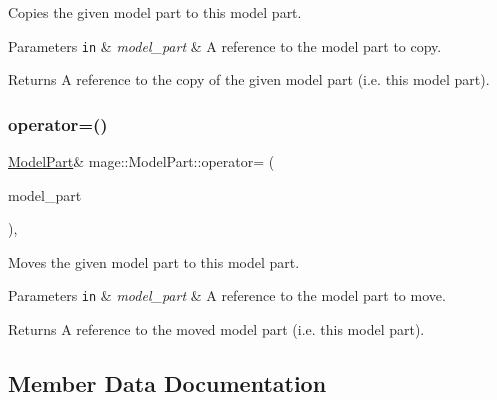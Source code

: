 Copies the given model part to this model part.


\begin{DoxyParams}[1]{Parameters}
\mbox{\tt in}  & {\em model\+\_\+part} & A reference to the model part to copy. \\
\hline
\end{DoxyParams}
\begin{DoxyReturn}{Returns}
A reference to the copy of the given model part (i.\+e. this model part). 
\end{DoxyReturn}
\hypertarget{structmage_1_1_model_part_aba7bba374ab20f6bf55fbb337c166e32}{}\label{structmage_1_1_model_part_aba7bba374ab20f6bf55fbb337c166e32} 
\subsubsection{\texorpdfstring{operator=()}{operator=()}\hspace{0.1cm}{\footnotesize\ttfamily [2/2]}}
{\footnotesize\ttfamily \hyperlink{structmage_1_1_model_part}{Model\+Part}\& mage\+::\+Model\+Part\+::operator= (\begin{DoxyParamCaption}\item[{\hyperlink{structmage_1_1_model_part}{Model\+Part} \&\&}]{model\+\_\+part }\end{DoxyParamCaption})\hspace{0.3cm}{\ttfamily [default]}, {\ttfamily [noexcept]}}

Moves the given model part to this model part.


\begin{DoxyParams}[1]{Parameters}
\mbox{\tt in}  & {\em model\+\_\+part} & A reference to the model part to move. \\
\hline
\end{DoxyParams}
\begin{DoxyReturn}{Returns}
A reference to the moved model part (i.\+e. this model part). 
\end{DoxyReturn}


\subsection{Member Data Documentation}
\hypertarget{structmage_1_1_model_part_ab5b4cb74ac7d725896825b0f7ce8472a}{}\label{structmage_1_1_model_part_ab5b4cb74ac7d725896825b0f7ce8472a} 
